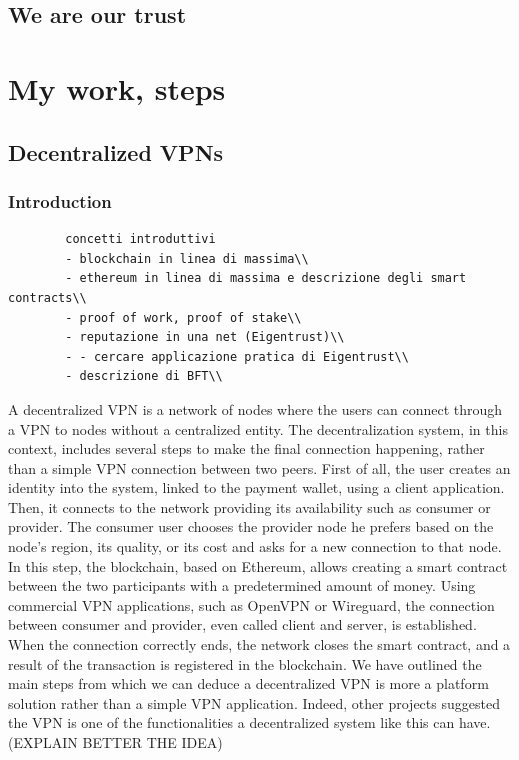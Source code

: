 \documentclass[]{article}
\begin{document}
	\subsection{We are our trust}


	\section{My work, steps}
	\subsection{Decentralized VPNs}
	\subsubsection{Introduction}
		
	\begin{verbatim}
		concetti introduttivi
		- blockchain in linea di massima\\
		- ethereum in linea di massima e descrizione degli smart contracts\\
		- proof of work, proof of stake\\
		- reputazione in una net (Eigentrust)\\
		- - cercare applicazione pratica di Eigentrust\\
		- descrizione di BFT\\
	\end{verbatim}

	A decentralized VPN is a network of nodes where the users can connect through a VPN to nodes without a centralized entity. The decentralization system, in this context, includes several steps to make the final connection happening, rather than a simple VPN connection between two peers.
	First of all, the user creates an identity into the system, linked to the payment wallet, using a client application. Then, it connects to the network providing its availability such as consumer or provider. The consumer user chooses the provider node he prefers based on the node's region, its quality, or its cost and asks for a new connection to that node. In this step, the blockchain, based on Ethereum, allows creating a smart contract between the two participants with a predetermined amount of money. Using commercial VPN applications, such as OpenVPN or Wireguard, the connection between consumer and provider, even called client and server, is established. When the connection correctly ends, the network closes the smart contract, and a result of the transaction is registered in the blockchain. 
	We have outlined the main steps from which we can deduce a decentralized VPN is more a platform solution rather than a simple VPN application. Indeed, other projects suggested the VPN is one of the functionalities a decentralized system like this can have. (EXPLAIN BETTER THE IDEA)  
		          
\end{document}
